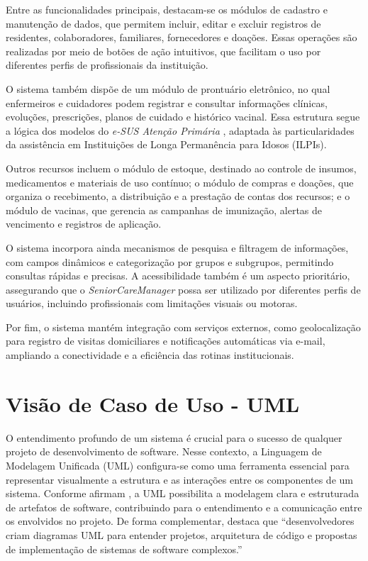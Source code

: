 Entre as funcionalidades principais, destacam-se os módulos de cadastro e manutenção de dados, que permitem incluir, editar e excluir registros de residentes, colaboradores, familiares, fornecedores e doações. Essas operações são realizadas por meio de botões de ação intuitivos, que facilitam o uso por diferentes perfis de profissionais da instituição.  

O sistema também dispõe de um módulo de prontuário eletrônico, no qual enfermeiros e cuidadores podem registrar e consultar informações clínicas, evoluções, prescrições, planos de cuidado e histórico vacinal. Essa estrutura segue a lógica dos modelos do \textit{e-SUS Atenção Primária} \textcite{ministeriosaude2023esus}, adaptada às particularidades da assistência em Instituições de Longa Permanência para Idosos (ILPIs).

Outros recursos incluem o módulo de estoque, destinado ao controle de insumos, medicamentos e materiais de uso contínuo; o módulo de compras e doações, que organiza o recebimento, a distribuição e a prestação de contas dos recursos; e o módulo de vacinas, que gerencia as campanhas de imunização, alertas de vencimento e registros de aplicação.  

O sistema incorpora ainda mecanismos de pesquisa e filtragem de informações, com campos dinâmicos e categorização por grupos e subgrupos, permitindo consultas rápidas e precisas. A acessibilidade também é um aspecto prioritário, assegurando que o \textit{SeniorCareManager} possa ser utilizado por diferentes perfis de usuários, incluindo profissionais com limitações visuais ou motoras.  

Por fim, o sistema mantém integração com serviços externos, como geolocalização para registro de visitas domiciliares e notificações automáticas via e-mail, ampliando a conectividade e a eficiência das rotinas institucionais.


\chapter{Visão de Caso de Uso - UML}

O entendimento profundo de um sistema é crucial para o sucesso de qualquer projeto de desenvolvimento de software. Nesse contexto, a Linguagem de Modelagem Unificada (UML) configura-se como uma ferramenta essencial para representar visualmente a estrutura e as interações entre os componentes de um sistema. Conforme afirmam \textcite{Guedes2018}, a UML possibilita a modelagem clara e estruturada de artefatos de software, contribuindo para o entendimento e a comunicação entre os envolvidos no projeto. De forma complementar, \textcite{Miro2024} destaca que “desenvolvedores criam diagramas UML para entender projetos, arquitetura de código e propostas de implementação de sistemas de software complexos.”

